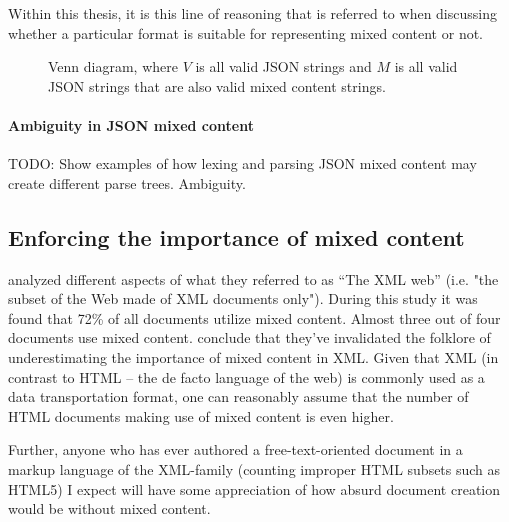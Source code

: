 \documentclass{scrreprt}
\begin{document}
Within this thesis, it is this line of reasoning that is referred to when discussing whether a particular format is suitable for representing mixed content or not.




\begin{figure}[h]
\centering


  \caption{Venn diagram, where \(V\) is all valid JSON strings and \(M\) is all valid JSON strings that are also valid mixed content strings. }
  \label{fig:mixed-content-venn-json}
\end{figure}



\paragraph{Ambiguity in JSON mixed content}
TODO: Show examples of how lexing and parsing JSON mixed content may create different parse trees. Ambiguity.



\subsection{Enforcing the importance of mixed content}

\citet*{mignet} analyzed different aspects of what they referred to as ``The XML web'' (i.e. "the subset of the Web made of XML documents only"). During this study it was found that 72\% of all documents utilize mixed content. Almost three out of four documents use mixed content. \citet{mignet} conclude that they've invalidated the folklore of underestimating the importance of mixed content in XML. Given that XML (in contrast to HTML -- the de facto language of the web) is commonly used as a data transportation format, one can reasonably assume that the number of HTML documents making use of mixed content is even higher.



Further, anyone who has ever authored a free-text-oriented document in a markup language of the XML-family (counting improper HTML subsets such as HTML5) I expect will have some appreciation of how absurd document creation would be without mixed content.
\end{document}
